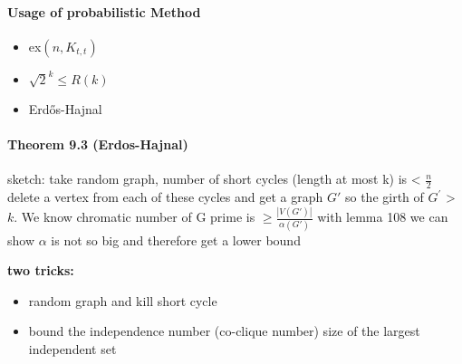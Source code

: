 \paragraph{Usage of probabilistic Method}
\begin{itemize}
    \item ex$(n,K_{t,t})$
    \item $\sqrt{2}^k \leq R(k)$
    \item Erd\H{o}s-Hajnal
\end{itemize}


\paragraph{Theorem 9.3 (Erdos-Hajnal)} 
sketch: take random graph, number of short cycles (length at most k) 
is < $\frac{n}{2}$ delete a vertex from each of these cycles and get 
a graph $G'$ so the girth of $ G^\prime $ > $ k $.
We know chromatic number of G prime is $ \geq \frac{|V(G')|}{\alpha(G')}$
with lemma 108 we can show $\alpha$ is not so big 
and therefore get a lower bound

\smallskip \noindent
\textbf{two tricks:} 
\begin{itemize}
    \item random graph and kill short cycle 
    \item bound the independence number (co-clique number) size of the largest 
    independent set
\end{itemize}
